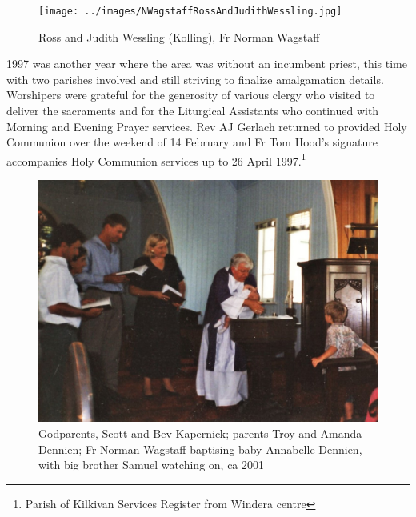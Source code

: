 \begin{figure}
\begin{center}
\texttt{[image: ../images/NWagstaffRossAndJudithWessling.jpg]}
\caption{Ross and Judith Wessling (Kolling), Fr Norman Wagstaff }
\end{center}
\end{figure}




1997 was another year where the area was without an incumbent priest, this time with two parishes involved and still striving to finalize amalgamation details. Worshipers were grateful for the generosity of various clergy who visited to deliver the sacraments and for the Liturgical Assistants who continued with Morning and Evening Prayer services. Rev AJ Gerlach returned to provided Holy Communion over the weekend of 14 February and Fr Tom Hood's signature accompanies Holy Communion services up to 26 April 1997.\footnote{Parish of Kilkivan Services Register from Windera centre}








\begin{figure}[!htb]
\begin{center}
\includegraphics[width=1.\textwidth,center]{../images/baptism2001.jpg}
\caption{Godparents, Scott and Bev Kapernick; parents Troy and Amanda Dennien; Fr Norman Wagstaff baptising baby Annabelle Dennien, with big brother Samuel watching on, ca 2001}
\end{center}
\end{figure}




